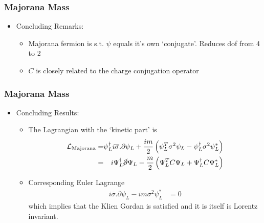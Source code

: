 \documentclass{beamer}
\begin{document}
 









 
\begin{frame}
	\frametitle{Majorana Mass}
	\begin{itemize}
		\item Concluding Remarks:
		\begin{itemize}
			\item Majorana fermion is s.t. $\psi$ equals it's own `conjugate'. \pause Reduces dof from 4 to 2
			\pause
			\item $C$ is closely related to the charge conjugation operator
		\end{itemize}



	\end{itemize}
\end{frame}

 









 
\begin{frame}
	\frametitle{Majorana Mass}
	\begin{itemize}
		\item Concluding Results:
		\begin{itemize}
		\pause
		\item The Lagrangian with the `kinetic part' is
		\pause
		\[
		\begin{alignedat}{2}\mathcal{L}_{\text{Majorana}} & = & \psi_{L}^{\dagger}i\overline{\sigma}.\partial\psi_{L}+\frac{im}{2}\left(\psi_{L}^{T}\sigma^{2}\psi_{L}-\psi_{L}^{\dagger}\sigma^{2}\psi_{L}^{*}\right)\\
		 & = & i\Psi_{L}^{\dagger}\cancel{\partial}\Psi_{L}-\frac{m}{2}\left(\Psi_{L}^{T}C\Psi_{L}+\Psi_{L}^{\dagger}C\Psi_{L}^{*}\right)
		\end{alignedat}
		\]
		\pause
		\item Corresponding Euler Lagrange
		\pause
		\[
		\begin{aligned}i\overline{\sigma}.\partial\psi_{L}-im\sigma^{2}\psi_{L}^{*} & =0\end{aligned}
		\]
		\pause
		which implies that the Klien Gordan is satisfied and \pause it is itself is Lorentz invariant.
		\end{itemize}



	\end{itemize}
\end{frame}
\end{document}
